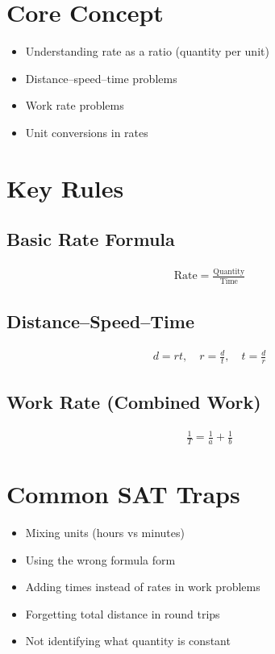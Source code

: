 
\section*{Core Concept}
\begin{itemize}
    \item Understanding rate as a ratio (quantity per unit)
    \item Distance--speed--time problems
    \item Work rate problems
    \item Unit conversions in rates
\end{itemize}

\section*{Key Rules}

\subsection*{Basic Rate Formula}
\begin{align*}
\text{Rate} = \frac{\text{Quantity}}{\text{Time}}
\end{align*}

\subsection*{Distance--Speed--Time}
\begin{align*}
d = rt, \quad r = \frac{d}{t}, \quad t = \frac{d}{r}
\end{align*}

\subsection*{Work Rate (Combined Work)}
\begin{align*}
\frac{1}{T} = \frac{1}{a} + \frac{1}{b}
\end{align*}

\section*{Common SAT Traps}
\begin{itemize}
    \item Mixing units (hours vs minutes)
    \item Using the wrong formula form
    \item Adding times instead of rates in work problems
    \item Forgetting total distance in round trips
    \item Not identifying what quantity is constant
\end{itemize}

